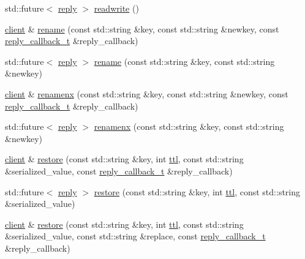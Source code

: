 \begin{DoxyCompactItemize}
\item 
std\+::future$<$ \hyperlink{classcpp__redis_1_1reply}{reply} $>$ \hyperlink{classcpp__redis_1_1client_afc139fc098703cf5ec661fedc0552184}{readwrite} ()
\item 
\hyperlink{classcpp__redis_1_1client}{client} \& \hyperlink{classcpp__redis_1_1client_abbc2bb4b988d5e3e539d65d3eb9f511f}{rename} (const std\+::string \&key, const std\+::string \&newkey, const \hyperlink{classcpp__redis_1_1client_a061a1140d36d2eaeda82b09a0bb3f9f2}{reply\+\_\+callback\+\_\+t} \&reply\+\_\+callback)
\item 
std\+::future$<$ \hyperlink{classcpp__redis_1_1reply}{reply} $>$ \hyperlink{classcpp__redis_1_1client_a6a4ab4ac68aa92560569db6683bb591c}{rename} (const std\+::string \&key, const std\+::string \&newkey)
\item 
\hyperlink{classcpp__redis_1_1client}{client} \& \hyperlink{classcpp__redis_1_1client_a80b0abd5548ae3bfe22ed008767689c0}{renamenx} (const std\+::string \&key, const std\+::string \&newkey, const \hyperlink{classcpp__redis_1_1client_a061a1140d36d2eaeda82b09a0bb3f9f2}{reply\+\_\+callback\+\_\+t} \&reply\+\_\+callback)
\item 
std\+::future$<$ \hyperlink{classcpp__redis_1_1reply}{reply} $>$ \hyperlink{classcpp__redis_1_1client_a1b5110b73c9561e5b235317fa03ee4bb}{renamenx} (const std\+::string \&key, const std\+::string \&newkey)
\item 
\hyperlink{classcpp__redis_1_1client}{client} \& \hyperlink{classcpp__redis_1_1client_a3598f781ae048b03edcdb07e8d2c0f41}{restore} (const std\+::string \&key, int \hyperlink{classcpp__redis_1_1client_a667bb7a6ead9c8cdaba534033a467367}{ttl}, const std\+::string \&serialized\+\_\+value, const \hyperlink{classcpp__redis_1_1client_a061a1140d36d2eaeda82b09a0bb3f9f2}{reply\+\_\+callback\+\_\+t} \&reply\+\_\+callback)
\item 
std\+::future$<$ \hyperlink{classcpp__redis_1_1reply}{reply} $>$ \hyperlink{classcpp__redis_1_1client_a5b7a7d7de93268198f27cd21f63ba337}{restore} (const std\+::string \&key, int \hyperlink{classcpp__redis_1_1client_a667bb7a6ead9c8cdaba534033a467367}{ttl}, const std\+::string \&serialized\+\_\+value)
\item 
\hyperlink{classcpp__redis_1_1client}{client} \& \hyperlink{classcpp__redis_1_1client_a5ebff3760403ee7d031083f185792780}{restore} (const std\+::string \&key, int \hyperlink{classcpp__redis_1_1client_a667bb7a6ead9c8cdaba534033a467367}{ttl}, const std\+::string \&serialized\+\_\+value, const std\+::string \&replace, const \hyperlink{classcpp__redis_1_1client_a061a1140d36d2eaeda82b09a0bb3f9f2}{reply\+\_\+callback\+\_\+t} \&reply\+\_\+callback)

\end{DoxyCompactItemize}
